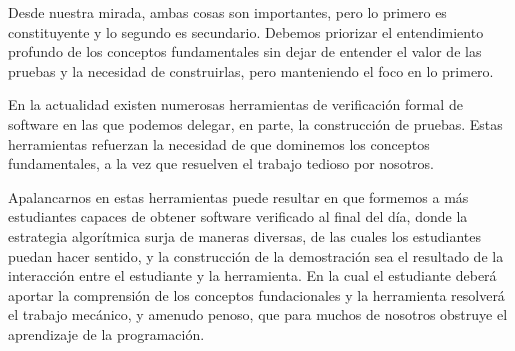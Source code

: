 \documentclass[12pt, a4paper, openany, fleqn]{book}
\begin{document}
    Desde nuestra mirada, ambas cosas son importantes, pero lo primero es constituyente y lo segundo es secundario. Debemos priorizar el entendimiento profundo de los conceptos fundamentales sin dejar de entender el valor de las pruebas y la necesidad de construirlas, pero manteniendo el foco en lo primero.

    En la actualidad existen numerosas herramientas de verificación formal de software en las que podemos delegar, en parte, la construcción de pruebas. Estas herramientas refuerzan la necesidad de que dominemos los conceptos fundamentales, a la vez que resuelven el trabajo tedioso por nosotros.

    Apalancarnos en estas herramientas puede resultar en que formemos a más estudiantes capaces de obtener software verificado al final del día, donde la estrategia algorítmica surja de maneras diversas, de las cuales los estudiantes puedan hacer sentido, y la construcción de la demostración sea el resultado de la interacción entre el estudiante y la herramienta. En la cual el estudiante deberá aportar la comprensión de los conceptos fundacionales y la herramienta resolverá el trabajo mecánico, y amenudo penoso, que para muchos de nosotros obstruye el aprendizaje de la programación.

    
    
\end{document}
